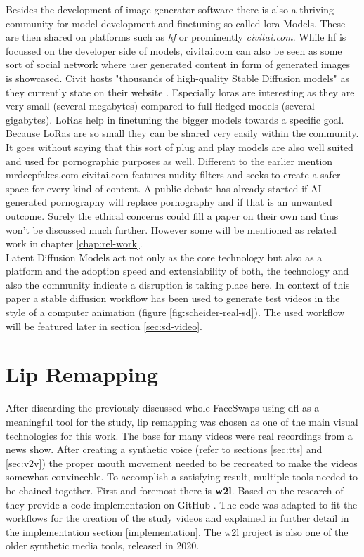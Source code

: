 \documentclass[
  a4paper,  %
  twoside,  %
  bibliography=totoc,
  headsepline,
  cleardoublepage=empty,
  parskip=half,
  draft=false
]{scrbook}
\begin{document}
Besides the development of image generator software there is also a thriving community for model development and finetuning so called \gls{lora} Models. These are then shared on platforms such as \textit{\gls{hf}} or prominently \textit{civitai.com}. While \gls{hf} is focussed on the developer side of models, civitai.com can also be seen as some sort of social network where user generated content in form of generated images is showcased. Civit hosts "thousands of high-quality Stable Diffusion models" as they currently state on their website \cite{CivitaiHomeOpenSource}. Especially \gls{lora}s are interesting as they are very small (several megabytes) compared to full fledged models (several gigabytes). LoRas help in finetuning the bigger models towards a specific goal. Because LoRas are so small they can be shared very easily within the community. It goes without saying that this sort of plug and play models are also well suited and used for pornographic purposes as well. Different to the earlier mention mrdeepfakes.com civitai.com features nudity filters and seeks to create a safer space for every kind of content. A public debate has already started if AI generated pornography will replace pornography and if that is an unwanted outcome. Surely the ethical concerns could fill a paper on their own and thus won't be discussed much further. However some will be mentioned as related work in chapter \ref{chap:rel-work}.\\
Latent Diffusion Models act not only as the core technology but also as a platform and the adoption speed and extensiability of both, the technology and also the community indicate a disruption is taking place here.
In context of this paper a stable diffusion workflow has been used to generate test videos in the style of a computer animation (figure \ref{fig:scheider-real-sd}). The used workflow will be featured later in section \ref{sec:sd-video}. 

\section{Lip Remapping}
\label{sec:lips}
After discarding the previously discussed whole FaceSwaps using \gls{dfl} as a meaningful tool for the study, lip remapping was chosen as one of the main visual technologies for this work. The base for many videos were real recordings from a news show. After creating a synthetic voice (refer to sections \ref{sec:tts} and \ref{sec:v2v}) the proper mouth movement needed to be recreated to make the videos somewhat convinceble. To accomplish a satisfying result, multiple tools needed to be chained together. First and foremost there is \textbf{\gls{w2l}}. Based on the research of \citet{prajwalLipSyncExpert2020} they provide a code implementation on GitHub \cite{mukhopadhyayWav2LipAccuratelyLipsyncing2023}. The code was adapted to fit the workflows for the creation of the study videos and explained in further detail in the implementation section \ref{implementation}. The \gls{w2l} project is also one of the older synthetic media tools, released in 2020.
\end{document}

